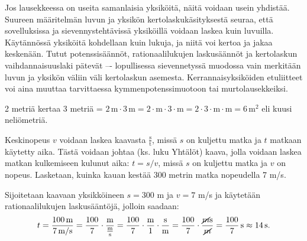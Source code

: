 Jos lausekkeessa on useita samanlaisia yksiköitä, näitä voidaan usein yhdistää. Suureen määritelmän luvun ja yksikön kertolaskukäsityksestä seuraa, että sovelluksissa ja sievennystehtävissä yksiköillä voidaan laskea kuin luvuilla. Käytännössä yksiköitä kohdellaan kuin lukuja, ja niitä voi kertoa ja jakaa keskenään. Tutut potenssisäännöt, rationaalilukujen laskusäännöt ja kertolaskun vaihdannaisuuslaki pätevät –- lopullisessa sievennetyssä muodossa vain merkitään luvun ja yksikön väliin väli kertolaskun asemesta. Kerrannaisyksiköiden etuliitteet voi aina muuttaa tarvittaessa kymmenpotenssimuotoon tai murtolausekkeiksi.

\begin{esimerkki}
2 metriä kertaa 3 metriä = $2\,\text{m} \cdot 3\,\text{m} = 2 \cdot \text{m} \cdot 3 \cdot \text{m}= 2 \cdot 3 \cdot \text{m} \cdot \text{m} =6\,\text{m}^2$ eli kuusi neliömetriä.
\end{esimerkki}

%
%
%	
%

%
%
%	


\begin{esimerkki}
Keskinopeus $v$ voidaan laskea kaavasta $\frac{\text{s}}{\text{t}}$, missä $s$ on kuljettu matka ja $t$ matkaan käytetty aika. Tästä voidaan johtaa (ks. luku Yhtälöt) kaava, jolla voidaan laskea matkan kulkemiseen kulunut aika: $t=s/v$, missä $s$ on kuljettu matka ja $v$ on nopeus. Lasketaan, kuinka kauan kestää 300 metrin matka nopeudella 7 m/s.

Sijoitetaan kaavaan yksikköineen $s=300$ m ja $v= 7$ m/s ja käytetään rationaalilukujen laskusääntöjä, jolloin saadaan:
\[t=\frac{100\,\textrm{m}}{7\,\textrm{m/s}} = \frac{100}{7} \cdot \frac{\textrm{m}}{\frac{\textrm{m}}{\textrm{s}}} 
= \frac{100}{7} \cdot \frac{\textrm{m}}{1} \cdot \frac{\textrm{s}}{\textrm{m}}
= \frac{100}{7} \cdot \frac{\cancel{m}\textrm{s}}{\cancel{m}}
=\frac{100}{7}\,\textrm{s} \approx 14\,\textrm{s}.\]
\end{esimerkki}


